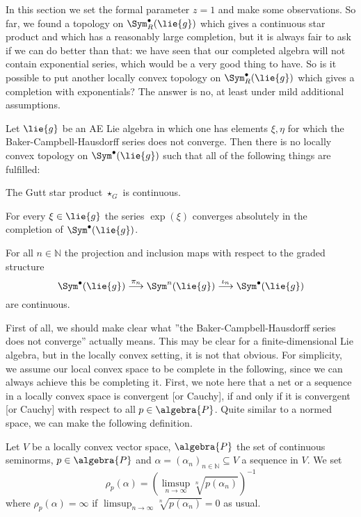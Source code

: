 In this section we set the formal parameter $z = 1$ and make some 
observations. So far, we found a topology on $\Sym_R^{\bullet}(\lie{g})$ which 
gives a continuous star product and which has a reasonably large completion, 
but it is always fair to ask if we can do better than that: we have seen that 
our completed algebra will not contain exponential series, which would be a 
very good thing to have. So is it possible to put another locally convex 
topology on $\Sym_R^{\bullet}(\lie{g})$ which gives a completion with 
exponentials? The answer is no, at least under mild additional assumptions. 
\begin{proposition}
	\label{LCAna:Prop:NoBetterTopology}
	Let $\lie{g}$ be an AE Lie algebra in which one has elements $\xi, \eta$ 
	for which the Baker-Campbell-Hausdorff series does not converge. 
	Then there is no locally convex topology on $\Sym^{\bullet}(\lie{g})$ 
	such that all of the following things are fulfilled:
	\begin{propositionlist}
		\item
		The Gutt star product $\star_G$ is continuous.
		\item
		For every $\xi \in \lie{g}$ the series $\exp(\xi)$ converges 
		absolutely in the completion of $\Sym^{\bullet}(\lie{g})$.
		\item
		For all $n \in \mathbb{N}$ the projection and inclusion maps with 
		respect to the graded structure
		\begin{equation*}
			\Sym^{\bullet}(\lie{g})
	    		\ot{$\pi_n$}{\longrightarrow}
    	    		\Sym^n(\lie{g})
	    	    	\ot{$\iota_n$}{\longrightarrow}
	    		\Sym^{\bullet}(\lie{g})
		\end{equation*}
		are continuous.
	\end{propositionlist}
\end{proposition}
First of all, we should make clear what ''the Baker-Campbell-Hausdorff series 
does not converge'' actually means. This may be clear for a finite-dimensional 
Lie algebra, but in the locally convex setting, it is not that obvious. For 
simplicity, we assume our local convex space to be complete in the 
following, since we can always achieve this be completing it. First, we note 
here that a net or a sequence in a locally convex space is  convergent [or 
Cauchy], if and only if it is convergent [or Cauchy] with respect 
to all $p \in \algebra{P}$. Quite similar to a normed space, we can make the 
following definition.
\begin{definition}
	\label{Def:RadiusOfConvergenceLCS}
	Let $V$ be a locally convex vector space, $\algebra{P}$ the set of 
	continuous seminorms, $p \in \algebra{P}$ and 
	$\alpha = (\alpha_n)_{n \in \mathbb{N}}\subseteq V$ a sequence in $V$. 
	We set
	\begin{equation*}
		\rho_p(\alpha)
		=
		\left(
			\limsup_{n \longrightarrow \infty}
			\sqrt[n]{p \left(\alpha_n \right)}
		\right)^{-1}
	\end{equation*}
	where $\rho_p(\alpha) = \infty$ if $\limsup_{n \longrightarrow \infty} 
	\sqrt[n]{p \left(\alpha_n \right)} = 0$ as usual.
\end{definition}
